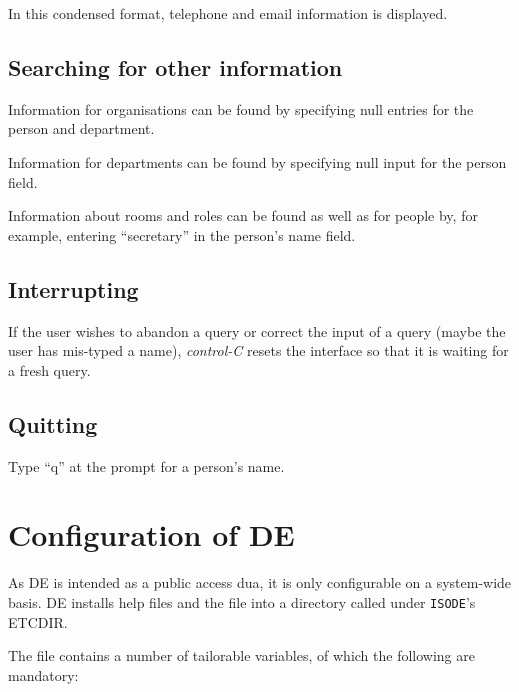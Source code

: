 In this condensed format, telephone and email information is displayed.

\subsection {Searching for other information}

Information for organisations can be found by specifying null entries for 
the person and department.

Information for departments can be found by specifying null input for
the person field.

Information about rooms and roles can be found as well as for people by, for
example, entering ``secretary'' in the person's name field.

\subsection{Interrupting}

If the user wishes to abandon a query or correct the input of a query (maybe
the user has mis-typed a name), {\em control-C} resets the interface 
so that it is
waiting for a fresh query.

\subsection{Quitting}

Type ``q'' at the prompt for a person's name.

\section {Configuration of DE}

As DE is intended as a public access dua, it is only configurable on a
system-wide basis.
DE installs help files and the  file into a directory 
called  under \verb+ISODE+'s ETCDIR.

The  file 
contains a number of tailorable variables, of which the
following are mandatory:

